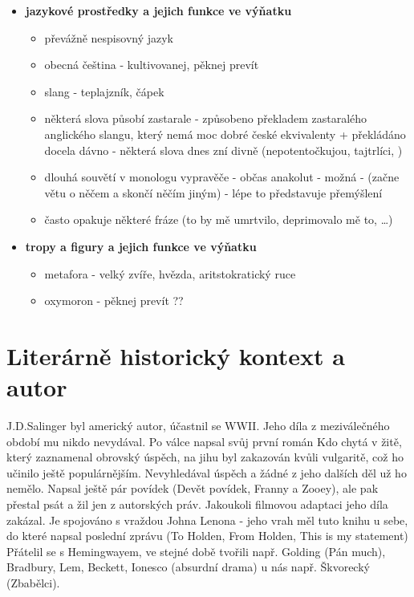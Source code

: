 \documentclass[11pt]{article}
\begin{document}
\begin{itemize}
\begin{itemize}
        \end{itemize}
        \item\textbf{jazykové prostředky a jejich funkce ve výňatku}
        \begin{itemize}
            \item převážně nespisovný jazyk
            \item obecná čeština - kultivovanej, pěknej prevít
            \item slang - teplajzník, čápek
            \item některá slova působí zastarale - způsobeno překladem zastaralého anglického slangu, který nemá moc dobré české ekvivalenty + překládáno docela dávno - některá slova dnes zní divně (nepotentočkujou, tajtrlíci, )
            \item dlouhá souvětí v monologu vypravěče - občas anakolut - možná - (začne větu o něčem a skončí něčím jiným) - lépe to představuje přemýšlení
            \item často opakuje některé fráze (to by mě umrtvilo, deprimovalo mě to, \dots)
        \end{itemize}
        \item\textbf{tropy a figury a jejich funkce ve výňatku}
        \begin{itemize}
            \item metafora - velký zvíře, hvězda, aritstokratický ruce
            \item oxymoron - pěknej prevít ??
        \end{itemize}
    \end{itemize}
    \section*{Literárně historický kontext a autor}
    J.D.Salinger byl americký autor, účastnil se WWII.
    Jeho díla z meziválečného období mu nikdo nevydával.
    Po válce napsal svůj první román Kdo chytá v žitě, který zaznamenal obrovský úspěch, na jihu byl zakazován kvůli vulgaritě, což ho učinilo ještě populárnějším.
    Nevyhledával úspěch a žádné z jeho dalších děl už ho nemělo. Napsal ještě pár povídek (Devět povídek, Franny a Zooey), ale pak přestal psát a žil jen z autorských práv.
    Jakoukoli filmovou adaptaci jeho díla zakázal.
    Je spojováno s vraždou Johna Lenona - jeho vrah měl tuto knihu u sebe, do které napsal poslední zprávu (To Holden, From Holden, This is my statement)
    Přátelil se s Hemingwayem, ve stejné době tvořili např. Golding (Pán much), Bradbury, Lem, Beckett, Ionesco (absurdní drama) u nás např. Škvorecký (Zbabělci).
\end{document}
